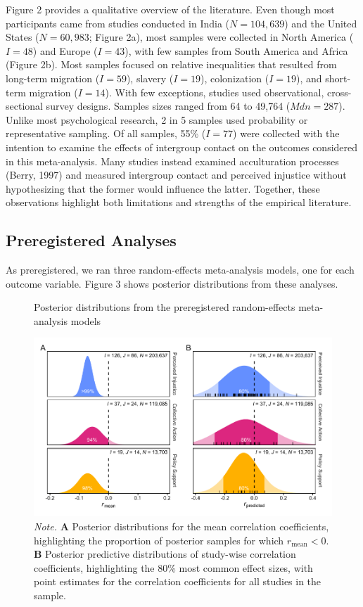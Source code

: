 \documentclass[12pt, letterpaper]{article}
\begin{document}
Figure 2 provides a qualitative overview of the literature. Even though
most participants came from studies conducted in India (\(N = 104,639\))
and the United States (\(N = 60,983\); Figure 2a), most samples were
collected in North America (\(I = 48\)) and Europe (\(I = 43\)), with
few samples from South America and Africa (Figure 2b). Most samples
focused on relative inequalities that resulted from long-term migration
(\(I = 59\)), slavery (\(I = 19\)), colonization (\(I = 19\)), and
short-term migration (\(I = 14\)). With few exceptions, studies used
observational, cross-sectional survey designs. Samples sizes ranged from
64 to 49,764 (\(\textit{Mdn} = 287\)). Unlike most psychological
research, 2 in 5 samples used probability or representative sampling. Of
all samples, 55\% (\(I = 77\)) were collected with the intention to
examine the effects of intergroup contact on the outcomes considered in
this meta-analysis. Many studies instead examined acculturation
processes (Berry, 1997) and measured intergroup contact and perceived
injustice without hypothesizing that the former would influence the
latter. Together, these observations highlight both limitations and
strengths of the empirical literature.

\hypertarget{preregistered-analyses-1}{%
\subsection{Preregistered Analyses}\label{preregistered-analyses-1}}

As preregistered, we ran three random-effects meta-analysis models, one
for each outcome variable. Figure 3 shows posterior distributions from
these analyses.

\begin{figure}[t!]
\centering
\caption{Posterior distributions from the preregistered random-effects meta-analysis models}
\includegraphics[scale=1]{../figures/figure-3}
\caption*{\textit{Note.} \textbf{A} Posterior distributions for the mean correlation coefficients, highlighting the proportion of posterior samples for which $r_\text{mean} < 0$. \textbf{B} Posterior predictive distributions of study-wise correlation coefficients, highlighting the 80\% most common effect sizes, with point estimates for the correlation coefficients for all studies in the sample.}
\label{fig:f3}
\end{figure}
\end{document}
